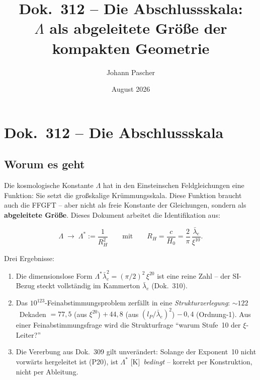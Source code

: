 \documentclass[11pt]{report}
\title{Dok.~312 -- Die Abschlussskala:\\
$\Lambda$ als abgeleitete Größe der kompakten Geometrie}
\author{Johann Pascher}
\date{August 2026}
\begin{document}
\maketitle
\tableofcontents

\chapter*{Dok.~312 -- Die Abschlussskala}

\section*{Worum es geht}

Die kosmologische Konstante $\Lambda$ hat in den Einsteinschen
Feldgleichungen eine Funktion: Sie setzt die großskalige Krümmungsskala.
Diese Funktion braucht auch die FFGFT -- aber nicht als freie Konstante
der Gleichungen, sondern als \textbf{abgeleitete Größe}. Dieses Dokument
arbeitet die Identifikation aus:

\[
  \Lambda \;\longrightarrow\; \Lambda^{*} := \frac{1}{R_H^2}
  \qquad\text{mit}\qquad
  R_H = \frac{c}{H_0} = \frac{2}{\pi}\,\frac{\bar\lambda_e}{\xi^{10}}.
\]

Drei Ergebnisse:
\begin{enumerate}
  \item Die dimensionslose Form
        $\Lambda^{*}\bar\lambda_e^{2} = (\pi/2)^{2}\,\xi^{20}$
        ist eine reine Zahl -- der SI-Bezug steckt vollständig im
        Kammerton $\bar\lambda_e$ (Dok.~310).
  \item Das $10^{123}$-Feinabstimmungsproblem zerfällt in eine
        \emph{Strukturzerlegung}: $\sim\!122$~Dekaden
        $= 77{,}5$ (aus $\xi^{20}$) $+\,44{,}8$ (aus
        $(l_P/\bar\lambda_e)^2$) $-\,0{,}4$ (Ordnung-1). Aus einer
        Feinabstimmungsfrage wird die Strukturfrage
        \enquote{warum Stufe~10 der $\xi$-Leiter?}
  \item Die Vererbung aus Dok.~309 gilt unverändert: Solange der
        Exponent~10 nicht vorwärts hergeleitet ist (P20), ist
        $\Lambda^{*}$ [K]~\emph{bedingt} -- korrekt per Konstruktion,
        nicht per Ableitung.
\end{enumerate}
\end{document}
